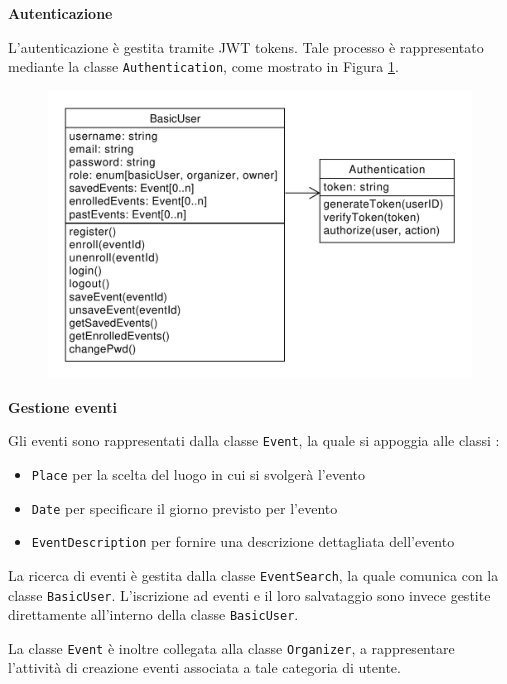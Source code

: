 \documentclass[9pt]{extarticle}
\begin{document}
\newpage

\textbf{Autenticazione}

L'autenticazione è gestita tramite JWT tokens. Tale processo è rappresentato mediante la classe \verb*|Authentication|, come mostrato in Figura \ref{fig:classDiagramAuthentication}.


\begin{figure}[!htb]
	\centering
	\includegraphics[width=.8\linewidth]{./images/classDiagramAuthentication.pdf}
	\caption{}
	\label{fig:classDiagramAuthentication}
\end{figure}

\textbf{Gestione eventi}

Gli eventi sono rappresentati dalla classe \verb*|Event|, la quale si appoggia alle classi :
\begin{itemize}
	\item \verb*|Place| per la scelta del luogo in cui si svolgerà l'evento
	\item \verb*|Date| per specificare il giorno previsto per l'evento
	\item \verb*|EventDescription| per fornire una descrizione dettagliata dell'evento
\end{itemize}

La ricerca di eventi è gestita dalla classe \verb*|EventSearch|, la quale comunica con la classe \verb*|BasicUser|. L'iscrizione ad eventi e il loro salvataggio sono invece gestite direttamente all'interno della classe \verb*|BasicUser|.

La classe \verb*|Event| è inoltre collegata alla classe \verb*|Organizer|, a rappresentare l'attività di creazione eventi associata a tale categoria di utente.

\newpage
\end{document}
